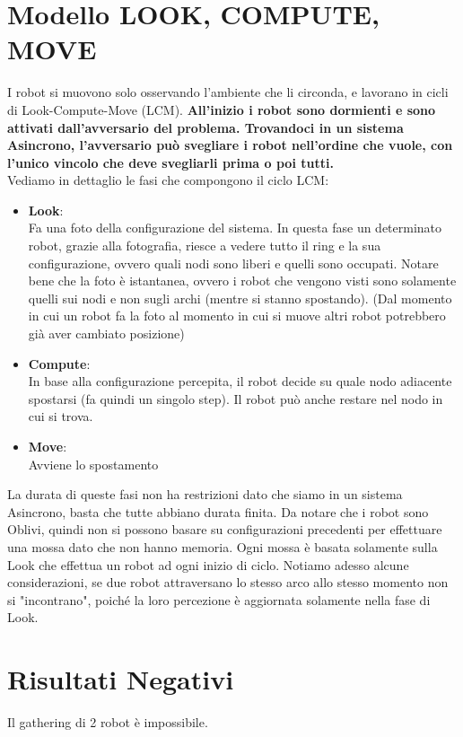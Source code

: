 \section{Modello LOOK, COMPUTE, MOVE}
I robot si muovono solo osservando l'ambiente che li circonda, e lavorano in
cicli di Look-Compute-Move (LCM). \textbf{All'inizio i robot sono dormienti e
    sono attivati dall'avversario del problema. Trovandoci in un sistema Asincrono,
    l'avversario può svegliare i robot nell'ordine che vuole, con l'unico vincolo
    che deve svegliarli prima o poi tutti.}\\
Vediamo in dettaglio le fasi che compongono il ciclo LCM:
\begin{itemize}
    \item \textbf{Look}:\\
          Fa una foto della configurazione del sistema. In questa fase un
          determinato robot, grazie alla fotografia, riesce a vedere tutto il ring
          e la sua configurazione, ovvero quali nodi sono liberi e quelli sono
          occupati. Notare bene che la foto è istantanea, ovvero i robot che
          vengono visti sono solamente quelli sui nodi e non sugli archi (mentre
          si stanno spostando). (Dal momento in cui un robot fa la foto al momento
          in cui si muove altri robot potrebbero già aver cambiato posizione)

    \item \textbf{Compute}:\\
          In base alla configurazione percepita, il robot decide su quale nodo
          adiacente spostarsi (fa quindi un singolo step). Il robot può anche
          restare nel nodo in cui si trova.

    \item \textbf{Move}: \\
          Avviene lo spostamento
\end{itemize}
La durata di queste fasi non ha restrizioni dato che siamo in un sistema
Asincrono, basta che tutte abbiano durata finita. Da notare che i robot sono
Oblivi, quindi non si possono basare su configurazioni precedenti per effettuare
una mossa dato che non hanno memoria. Ogni mossa è basata solamente sulla Look
che effettua un robot ad ogni inizio di ciclo. Notiamo adesso alcune
considerazioni, se due robot attraversano lo stesso arco allo stesso momento non
si "incontrano", poiché la loro percezione è aggiornata solamente nella fase di
Look.\\

\section{Risultati Negativi}
\begin{theorem}
    Il gathering di 2 robot è impossibile.
\end{theorem}

